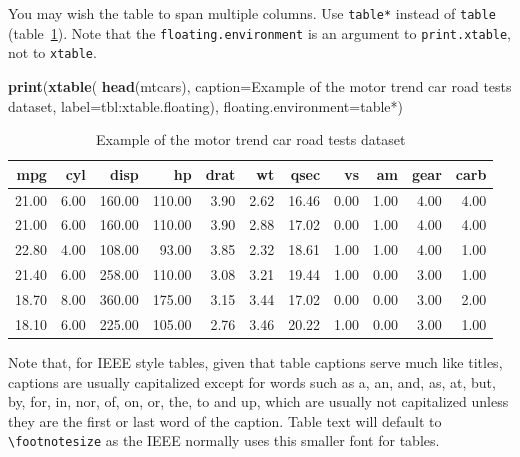 \documentclass[a4paper,conference]{IEEEtran}
\newenvironment{Shaded}{\begin{snugshade}}{\end{snugshade}}
\newcommand{\AttributeTok}[1]{\textcolor[rgb]{0.13,0.29,0.53}{#1}}
\newcommand{\FunctionTok}[1]{\textcolor[rgb]{0.13,0.29,0.53}{\textbf{#1}}}
\newcommand{\NormalTok}[1]{#1}
\newcommand{\StringTok}[1]{\textcolor[rgb]{0.31,0.60,0.02}{#1}}
\begin{document}
You may wish the table to span multiple columns. Use \texttt{table*}
instead of \texttt{table} (table~\ref{tbl:xtable.floating}). Note that
the \texttt{floating.environment} is an argument to
\texttt{print.xtable}, not to \texttt{xtable}.

\begin{Shaded}
\begin{Highlighting}[]
\FunctionTok{print}\NormalTok{(}\FunctionTok{xtable}\NormalTok{(}
    \FunctionTok{head}\NormalTok{(mtcars),}
    \AttributeTok{caption=}\StringTok{\textquotesingle{}Example of the motor trend}
\StringTok{             car road tests dataset\textquotesingle{}}\NormalTok{,}
    \AttributeTok{label=}\StringTok{\textquotesingle{}tbl:xtable.floating\textquotesingle{}}\NormalTok{),}
  \AttributeTok{floating.environment=}\StringTok{\textquotesingle{}table*\textquotesingle{}}\NormalTok{)}
\end{Highlighting}
\end{Shaded}

\begin{table}[!t]
\centering
\caption{Example of the motor trend
             car road tests dataset} 
\label{tbl:xtable.floating}
\begin{tabular}{rrrrrrrrrrr}
  \hline
mpg & cyl & disp & hp & drat & wt & qsec & vs & am & gear & carb \\ 
  \hline
21.00 & 6.00 & 160.00 & 110.00 & 3.90 & 2.62 & 16.46 & 0.00 & 1.00 & 4.00 & 4.00 \\ 
  21.00 & 6.00 & 160.00 & 110.00 & 3.90 & 2.88 & 17.02 & 0.00 & 1.00 & 4.00 & 4.00 \\ 
  22.80 & 4.00 & 108.00 & 93.00 & 3.85 & 2.32 & 18.61 & 1.00 & 1.00 & 4.00 & 1.00 \\ 
  21.40 & 6.00 & 258.00 & 110.00 & 3.08 & 3.21 & 19.44 & 1.00 & 0.00 & 3.00 & 1.00 \\ 
  18.70 & 8.00 & 360.00 & 175.00 & 3.15 & 3.44 & 17.02 & 0.00 & 0.00 & 3.00 & 2.00 \\ 
  18.10 & 6.00 & 225.00 & 105.00 & 2.76 & 3.46 & 20.22 & 1.00 & 0.00 & 3.00 & 1.00 \\ 
   \hline
\end{tabular}
\end{table}

Note that, for IEEE style tables, given that table captions serve much
like titles, captions are usually capitalized except for words such as
a, an, and, as, at, but, by, for, in, nor, of, on, or, the, to and up,
which are usually not capitalized unless they are the first or last word
of the caption. Table text will default to
\texttt{\textbackslash{}footnotesize} as the IEEE normally uses this
smaller font for tables.
\end{document}
